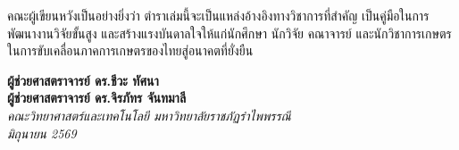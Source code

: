 \documentclass[10pt]{book}
\begin{document}
คณะผู้เขียนหวังเป็นอย่างยิ่งว่า ตำราเล่มนี้จะเป็นแหล่งอ้างอิงทางวิชาการที่สำคัญ เป็นคู่มือในการพัฒนางานวิจัยขั้นสูง และสร้างแรงบันดาลใจให้แก่นักศึกษา นักวิจัย คณาจารย์ และนักวิชาการเกษตร ในการขับเคลื่อนภาคการเกษตรของไทยสู่อนาคตที่ยั่งยืน

\vspace{1cm}
\noindent\textbf{ผู้ช่วยศาสตราจารย์ ดร.ชีวะ ทัศนา\\ผู้ช่วยศาสตราจารย์ ดร.จิรภัทร จันทมาลี}\\
\textit{คณะวิทยาศาสตร์และเทคโนโลยี มหาวิทยาลัยราชภัฏรำไพพรรณี}\\
\textit{มิถุนายน 2569}

\tableofcontents

\clearpage
{}
{}
\listoffigures

\clearpage
{}
{}
\listoftables

\mainmatter















\backmatter
\appendix







\printindex
\end{document}
